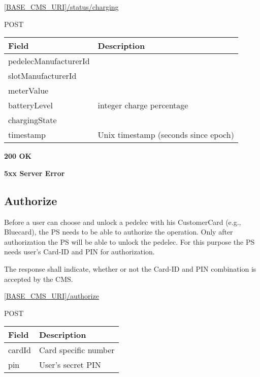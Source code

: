  \url{[BASE_CMS_URI]/status/charging}

 POST

\newpage
{}
\begin{table}[!h]
\vspace{-7mm}
\begin{tabularx}{\linewidth}{ | l | X | }
  \hline
  \rowcolor{table-head}
  Field & Description \\
  \hline
  	pedelecManufacturerId			& \\
  	slotManufacturerId					& \\
  	meterValue & \\
  	batteryLevel & integer charge percentage \\
  	chargingState			& \\
 	timestamp			& Unix timestamp (seconds since epoch) \\
  	
    \hline
\end{tabularx}
\end{table}

 \textbf{200 OK}

 \textbf{5xx Server Error}

\subsection{Authorize}

Before a user can choose and unlock a pedelec with his CustomerCard (e.g., Bluecard), the \acs{PS} needs to be able to authorize the operation. Only after authorization the \acs{PS} will be able to unlock the pedelec. For this purpose the \acs{PS} needs user's Card-ID and PIN for authorization.

The response shall indicate, whether or not the Card-ID and PIN combination is accepted by the \acs{CMS}.

 \url{[BASE_CMS_URI]/authorize}

 POST

\begin{table}[!h]
\vspace{-7mm}
\begin{tabularx}{\linewidth}{ | l | X | }
  \hline
  \rowcolor{table-head}
  Field & Description \\
  \hline
  	cardId 		& Card specific number\\
  	pin			& User's secret PIN \\
    \hline
\end{tabularx}
\end{table}

